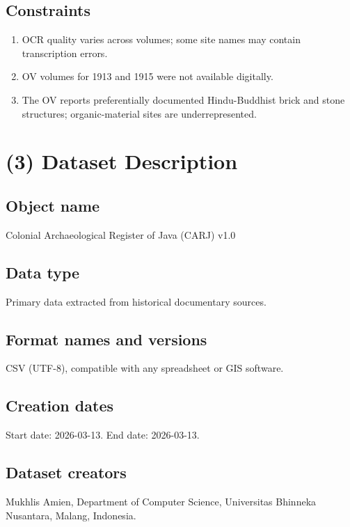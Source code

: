 \documentclass[11pt]{article}
\begin{document}
\subsection{Constraints}

\begin{enumerate}
    \item OCR quality varies across volumes; some site names may contain transcription errors.
    \item OV volumes for 1913 and 1915 were not available digitally.
    \item The OV reports preferentially documented Hindu-Buddhist brick and stone structures; organic-material sites are underrepresented.
\end{enumerate}

\section{(3) Dataset Description}

\subsection{Object name}

Colonial Archaeological Register of Java (CARJ) v1.0

\subsection{Data type}

Primary data extracted from historical documentary sources.

\subsection{Format names and versions}

CSV (UTF-8), compatible with any spreadsheet or GIS software.

\subsection{Creation dates}

Start date: 2026-03-13. End date: 2026-03-13.

\subsection{Dataset creators}

Mukhlis Amien, Department of Computer Science, Universitas Bhinneka Nusantara, Malang, Indonesia.
\end{document}
